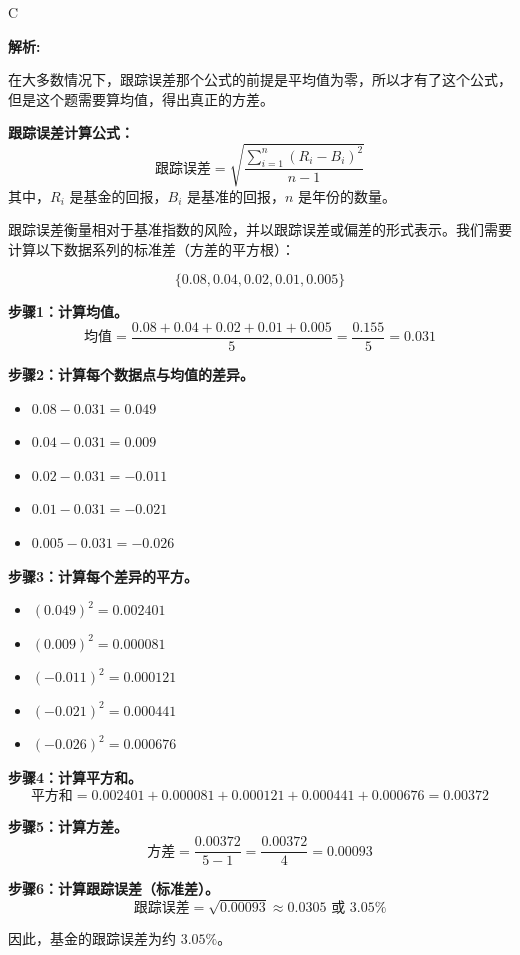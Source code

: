 \documentclass{article}
\newenvironment{explanation}
{\textbf{解析:}\par}
{\par}
\begin{document}
\begin{correctanswer}
    C
\end{correctanswer}

\begin{explanation}
    在大多数情况下，跟踪误差那个公式的前提是平均值为零，所以才有了这个公式，但是这个题需要算均值，得出真正的方差。

    \textbf{跟踪误差计算公式：}
    \[
    \text{跟踪误差} = \sqrt{\frac{\sum_{i=1}^{n} (R_i - B_i)^2}{n - 1}}
    \]
    其中，\(R_i\) 是基金的回报，\(B_i\) 是基准的回报，\(n\) 是年份的数量。

    跟踪误差衡量相对于基准指数的风险，并以跟踪误差或偏差的形式表示。我们需要计算以下数据系列的标准差（方差的平方根）：

    \[
    \{0.08, 0.04, 0.02, 0.01, 0.005\}
    \]

    \textbf{步骤1：计算均值。}
    \[
    \text{均值} = \frac{0.08 + 0.04 + 0.02 + 0.01 + 0.005}{5} = \frac{0.155}{5} = 0.031
    \]

    \textbf{步骤2：计算每个数据点与均值的差异。}
    \begin{itemize}
        \item \(0.08 - 0.031 = 0.049\)
        \item \(0.04 - 0.031 = 0.009\)
        \item \(0.02 - 0.031 = -0.011\)
        \item \(0.01 - 0.031 = -0.021\)
        \item \(0.005 - 0.031 = -0.026\)
    \end{itemize}

    \textbf{步骤3：计算每个差异的平方。}
    \begin{itemize}
        \item \( (0.049)^2 = 0.002401\)
        \item \( (0.009)^2 = 0.000081\)
        \item \( (-0.011)^2 = 0.000121\)
        \item \( (-0.021)^2 = 0.000441\)
        \item \( (-0.026)^2 = 0.000676\)
    \end{itemize}

    \textbf{步骤4：计算平方和。}
    \[
    \text{平方和} = 0.002401 + 0.000081 + 0.000121 + 0.000441 + 0.000676 = 0.00372
    \]

    \textbf{步骤5：计算方差。}
    \[
    \text{方差} = \frac{0.00372}{5 - 1} = \frac{0.00372}{4} = 0.00093
    \]

    \textbf{步骤6：计算跟踪误差（标准差）。}
    \[
    \text{跟踪误差} = \sqrt{0.00093} \approx 0.0305 \text{ 或 } 3.05\%
    \]

    因此，基金的跟踪误差为约 \(3.05\%\)。
\end{explanation}
\end{document}
